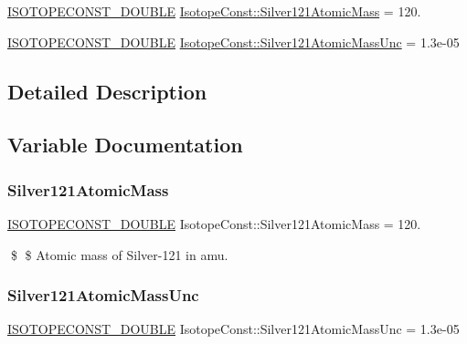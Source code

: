 \begin{DoxyCompactItemize}
\item 
\mbox{\hyperlink{group___isotope_const-_macros_ga8f45a7272ce02c0b4c65c44636ed719a}{I\+S\+O\+T\+O\+P\+E\+C\+O\+N\+S\+T\+\_\+\+D\+O\+U\+B\+LE}} \mbox{\hyperlink{group___isotope_const-_silver-_ag121_gaf1f345eeebe02a77ce3dd32bdf87a5f9}{Isotope\+Const\+::\+Silver121\+Atomic\+Mass}} = 120.
\item 
\mbox{\hyperlink{group___isotope_const-_macros_ga8f45a7272ce02c0b4c65c44636ed719a}{I\+S\+O\+T\+O\+P\+E\+C\+O\+N\+S\+T\+\_\+\+D\+O\+U\+B\+LE}} \mbox{\hyperlink{group___isotope_const-_silver-_ag121_ga04b8b230cb8d7db147655b5e1f4ee875}{Isotope\+Const\+::\+Silver121\+Atomic\+Mass\+Unc}} = 1.\+3e-\/05
\end{DoxyCompactItemize}


\subsection{Detailed Description}


\subsection{Variable Documentation}
\mbox{\label{group___isotope_const-_silver-_ag121_gaf1f345eeebe02a77ce3dd32bdf87a5f9}} 
\subsubsection{\texorpdfstring{Silver121\+Atomic\+Mass}{Silver121AtomicMass}}
{\footnotesize\ttfamily \mbox{\hyperlink{group___isotope_const-_macros_ga8f45a7272ce02c0b4c65c44636ed719a}{I\+S\+O\+T\+O\+P\+E\+C\+O\+N\+S\+T\+\_\+\+D\+O\+U\+B\+LE}} Isotope\+Const\+::\+Silver121\+Atomic\+Mass = 120.}

\$ \$ Atomic mass of Silver-\/121 in amu. \mbox{\label{group___isotope_const-_silver-_ag121_ga04b8b230cb8d7db147655b5e1f4ee875}} 
\subsubsection{\texorpdfstring{Silver121\+Atomic\+Mass\+Unc}{Silver121AtomicMassUnc}}
{\footnotesize\ttfamily \mbox{\hyperlink{group___isotope_const-_macros_ga8f45a7272ce02c0b4c65c44636ed719a}{I\+S\+O\+T\+O\+P\+E\+C\+O\+N\+S\+T\+\_\+\+D\+O\+U\+B\+LE}} Isotope\+Const\+::\+Silver121\+Atomic\+Mass\+Unc = 1.\+3e-\/05}

